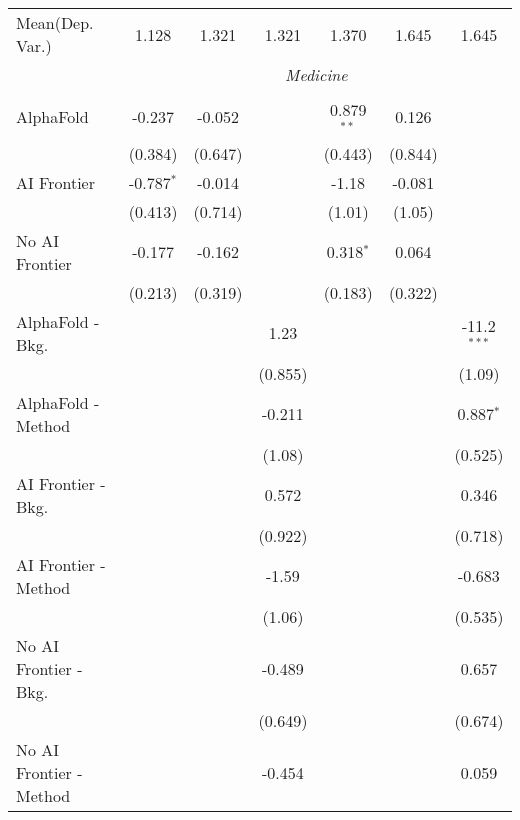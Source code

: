 \begin{tabular}{lcccccc}
Mean(Dep. Var.) & 1.128 & 1.321 & 1.321 & 1.370 & 1.645 & 1.645 \\
 & \multicolumn{6}{c}{\textit{Medicine}} \\ \\
   AlphaFold               & -0.237       & -0.052  &         & 0.879$^{**}$ & 0.126   &   \\   
                           & (0.384)      & (0.647) &         & (0.443)      & (0.844) &   \\   
   AI Frontier             & -0.787$^{*}$ & -0.014  &         & -1.18        & -0.081  &   \\   
                           & (0.413)      & (0.714) &         & (1.01)       & (1.05)  &   \\   
   No AI Frontier          & -0.177       & -0.162  &         & 0.318$^{*}$  & 0.064   &   \\   
                           & (0.213)      & (0.319) &         & (0.183)      & (0.322) &   \\   
   AlphaFold - Bkg.        &              &         & 1.23    &              &         & -11.2$^{***}$\\   
                           &              &         & (0.855) &              &         & (1.09)\\   
   AlphaFold - Method      &              &         & -0.211  &              &         & 0.887$^{*}$\\   
                           &              &         & (1.08)  &              &         & (0.525)\\   
   AI Frontier - Bkg.      &              &         & 0.572   &              &         & 0.346\\   
                           &              &         & (0.922) &              &         & (0.718)\\   
   AI Frontier - Method    &              &         & -1.59   &              &         & -0.683\\   
                           &              &         & (1.06)  &              &         & (0.535)\\   
   No AI Frontier - Bkg.   &              &         & -0.489  &              &         & 0.657\\   
                           &              &         & (0.649) &              &         & (0.674)\\   
   No AI Frontier - Method &              &         & -0.454  &              &         & 0.059\\   

\end{tabular}
